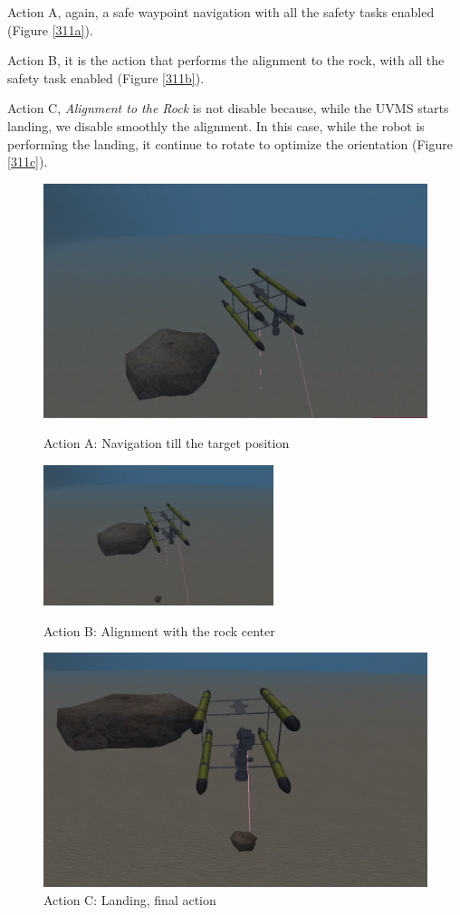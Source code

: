 \documentclass{article}
\begin{document}
\begin{description}
	\item Action A, again, a safe waypoint navigation with all the safety tasks enabled (Figure \ref{311a}). 
	\item Action B, it is the action that performs the alignment to the rock, with all the safety task enabled (Figure \ref{311b}). 
	\item Action C, \textit{Alignment to the Rock} is not disable because, while the UVMS starts landing, we disable smoothly the alignment. In this case, while the robot is performing the landing, it continue to rotate to optimize the orientation (Figure \ref{311c}).
\end{description}



\begin{figure}[htp]
\centering
\includegraphics[width=.6\textwidth]{312_Nav.png}\caption{Action A: Navigation till the target position}\label{311a}
\vspace{5px}
\centering
\includegraphics[width=0.6\textwidth]{312_Alr.png}\caption{Action B: Alignment with the rock center}\label{311b}
\vspace{5px}
\centering
\includegraphics[width=.6\textwidth]{312_Land.png}\caption{Action C: Landing, final action}\label{311c}
\label{fig:missionphase3}
\vspace{5px}
\end{figure}
\clearpage
\end{document}
